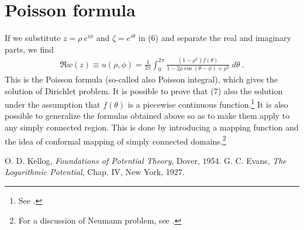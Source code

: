 \documentclass[12pt]{article}
\begin{document}
\section*{Poisson formula}
If we substitute $z=\rho\: e^{i\phi}$ and $\zeta=e^{i\theta}$ in (6) and separate the real and imaginary parts, we find
\begin{align}
\Re{w(z)}\equiv u(\rho,\phi)=\frac{1}{2\pi}\int_0^{2\pi}\!\!
\frac{(1-\rho^2)f(\theta)}{1-2\rho\cos{(\theta-\phi)}+\rho^2}\;d\theta\:.
\end{align}
This is the Poisson formula (so-called also Poisson integral), which gives the solution of Dirichlet problem. It is possible to prove that (7) also  the solution under the assumption that $f(\theta)$ is a piecewise continuous function.{\footnote{See \cite{cite:Kellog}.}} It is also possible to generalize the formulas obtained above so as to make them apply to any simply connected region. This is done by introducing a mapping function and the idea of conformal mapping of simply connected domains.{\footnote{For a discussion of Neumann problem, see \cite{cite:Evans}.}}    
\begin{thebibliography}{99}
O. D. Kellog, {\em Foundations of Potential Theory}, Dover, 1954.
G. C. Evans, {\em The Logarithmic Potential}, Chap. IV, New York, 1927.
\end{thebibliography}

\end{document}
